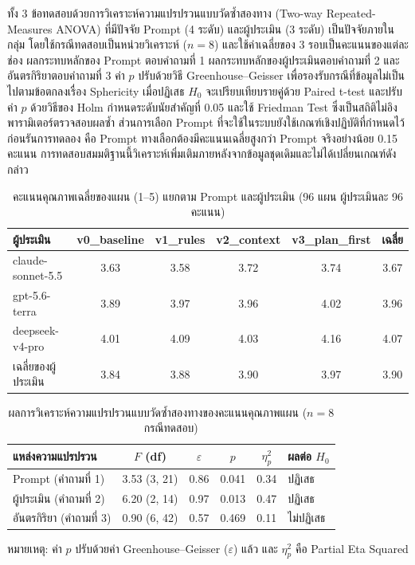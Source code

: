 ทั้ง 3 ข้อทดสอบด้วยการวิเคราะห์ความแปรปรวนแบบวัดซ้ำสองทาง (Two-way Repeated-Measures ANOVA) ที่มีปัจจัย Prompt (4 ระดับ) และผู้ประเมิน (3 ระดับ) เป็นปัจจัยภายในกลุ่ม โดยใช้กรณีทดสอบเป็นหน่วยวิเคราะห์ ($n = 8$) และใช้ค่าเฉลี่ยของ 3 รอบเป็นคะแนนของแต่ละช่อง ผลกระทบหลักของ Prompt ตอบคำถามที่ 1 ผลกระทบหลักของผู้ประเมินตอบคำถามที่ 2 และอันตรกิริยาตอบคำถามที่ 3 ค่า $p$ ปรับด้วยวิธี Greenhouse--Geisser \parencite{greenhouse1959} เพื่อรองรับกรณีที่ข้อมูลไม่เป็นไปตามข้อตกลงเรื่อง Sphericity เมื่อปฏิเสธ $H_0$ จะเปรียบเทียบรายคู่ด้วย Paired t-test และปรับค่า $p$ ด้วยวิธีของ Holm \parencite{holm1979} กำหนดระดับนัยสำคัญที่ 0.05 และใช้ Friedman Test ซึ่งเป็นสถิติไม่อิงพารามิเตอร์ตรวจสอบผลซ้ำ ส่วนการเลือก Prompt ที่จะใช้ในระบบยังใช้เกณฑ์เชิงปฏิบัติที่กำหนดไว้ก่อนรันการทดลอง คือ Prompt ทางเลือกต้องมีคะแนนเฉลี่ยสูงกว่า Prompt จริงอย่างน้อย 0.15 คะแนน การทดสอบสมมติฐานนี้วิเคราะห์เพิ่มเติมภายหลังจากข้อมูลชุดเดิมและไม่ได้เปลี่ยนเกณฑ์ดังกล่าว

\begin{table}[H]
\centering
\caption{คะแนนคุณภาพเฉลี่ยของแผน (1--5) แยกตาม Prompt และผู้ประเมิน (96 แผน ผู้ประเมินละ 96 คะแนน)}
\label{tab:prompt_eval}
\begin{tabular}{|p{3.4cm}|c|c|c|c|c|}
\hline
\textbf{ผู้ประเมิน} & \textbf{v0\_baseline} & \textbf{v1\_rules} & \textbf{v2\_context} & \textbf{v3\_plan\_first} & \textbf{เฉลี่ย} \\
\hline
claude-sonnet-5.5 & 3.63 & 3.58 & 3.72 & 3.74 & 3.67 \\ \hline
gpt-5.6-terra & 3.89 & 3.97 & 3.96 & 4.02 & 3.96 \\ \hline
deepseek-v4-pro & 4.01 & 4.09 & 4.03 & 4.16 & 4.07 \\ \hline
เฉลี่ยของผู้ประเมิน & 3.84 & 3.88 & 3.90 & 3.97 & 3.90 \\
\hline
\end{tabular}
\end{table}

\begin{table}[H]
\centering
\caption{ผลการวิเคราะห์ความแปรปรวนแบบวัดซ้ำสองทางของคะแนนคุณภาพแผน ($n = 8$ กรณีทดสอบ)}
\label{tab:prompt_hyp}
\begin{tabular}{|p{4.9cm}|c|c|c|c|p{1.8cm}|}
\hline
\textbf{แหล่งความแปรปรวน} & \textbf{$F$ (df)} & \textbf{$\varepsilon$} & \textbf{$p$} & \textbf{$\eta^2_p$} & \textbf{ผลต่อ $H_0$} \\
\hline
Prompt (คำถามที่ 1) & 3.53 (3, 21) & 0.86 & 0.041 & 0.34 & ปฏิเสธ \\ \hline
ผู้ประเมิน (คำถามที่ 2) & 6.20 (2, 14) & 0.97 & 0.013 & 0.47 & ปฏิเสธ \\ \hline
อันตรกิริยา (คำถามที่ 3) & 0.90 (6, 42) & 0.57 & 0.469 & 0.11 & ไม่ปฏิเสธ \\
\hline
\end{tabular}
\par\smallskip
{\small หมายเหตุ: ค่า $p$ ปรับด้วยค่า Greenhouse--Geisser ($\varepsilon$) แล้ว และ $\eta^2_p$ คือ Partial Eta Squared}
\end{table}

